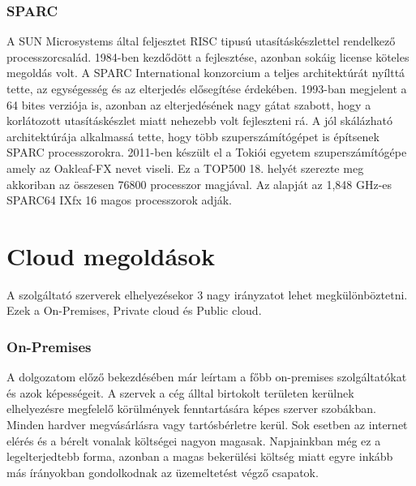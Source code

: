 \documentclass[12pt,oneside,justify,table]{book}
\begin{document}
\subsubsection{SPARC}
A SUN Microsystems által feljesztet RISC tipusú utasításkészlettel rendelkező processzorcsalád. 1984-ben kezdődött a fejlesztése, azonban sokáig license köteles megoldás volt. A SPARC International konzorcium a teljes architektúrát nyílttá tette, az egységesség és az elterjedés elősegítése érdekében. 1993-ban megjelent a 64 bites verziója is, azonban az elterjedésének nagy gátat szabott, hogy a korlátozott utasításkészlet miatt nehezebb volt fejleszteni rá. A jól skálázható architektúrája alkalmassá tette, hogy több szuperszámítógépet is építsenek SPARC processzorokra. 2011-ben készült el a Tokiói egyetem szuperszámítógépe amely az Oakleaf-FX nevet viseli. Ez a TOP500 18. helyét szerezte meg akkoriban az összesen 76800 processzor magjával. Az alapját az 1,848 GHz-es SPARC64 IXfx  16 magos processzorok adják. \cite{SPARC}

\section{Cloud megoldások}
A szolgáltató szerverek elhelyezésekor 3 nagy irányzatot lehet megkülönböztetni. Ezek a On-Premises, Private cloud és Public cloud. 

\subsubsection{On-Premises} 
A dolgozatom előző bekezdésében már leírtam a főbb on-premises szolgáltatókat és azok képességeit. A szervek a cég álltal birtokolt területen kerülnek elhelyezésre megfelelő körülmények fenntartására képes szerver szobákban. Minden hardver megvásárlásra vagy tartósbérletre kerül. Sok esetben az internet elérés és a bérelt vonalak költségei nagyon magasak. Napjainkban még ez a legelterjedtebb forma, azonban a magas bekerülési költség miatt egyre inkább más írányokban gondolkodnak az üzemeltetést végző csapatok.
\end{document}
